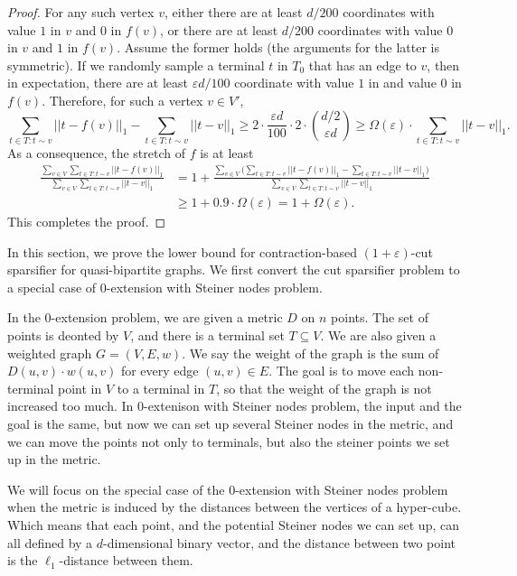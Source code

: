 \documentclass[11pt]{article}
\theoremstyle{definition}
\newcommand{\eps}{{\varepsilon}}
\begin{document}
\begin{proof}
For any such vertex $v$, either there are at least $d/200$ coordinates with value $1$ in $v$ and $0$ in $f(v)$, or there are at least $d/200$ coordinates with value $0$ in $v$ and $1$ in $f(v)$. Assume the former holds (the arguments for the latter is symmetric). 
If we randomly sample a terminal $t$ in $T_0$ that has an edge to $v$, then in expectation, there are at least $\eps d/100$ coordinate with value $1$ in and value $0$ in $f(v)$. Therefore, for such a vertex $v\in V'$, $$\sum_{t\in T: t\sim v}||t-f(v)||_1-\sum_{t\in T: t\sim v}||t-v||_1\ge 2\cdot \frac{\eps d}{100}\cdot 2\cdot \binom{d/2}{\eps d} \ge \Omega(\eps)\cdot \sum_{t\in T: t\sim v}||t-v||_1.$$
As a consequence, the stretch of $f$ is at least
\[
\begin{split}
\frac{\sum_{v\in V}\sum_{t\in T: t\sim v}||t-f(v)||_1}{\sum_{v\in V}\sum_{t\in T: t\sim v}||t-v||_1}
& =1+\frac{\sum_{v\in V}\big(\sum_{t\in T: t\sim v}||t-f(v)||_1-\sum_{t\in T: t\sim v}||t-v||_1\big)}{\sum_{v\in V}\sum_{t\in T: t\sim v}||t-v||_1}\\
& \ge 1+0.9\cdot \Omega(\eps) = 1+\Omega(\eps).
\end{split}
\]
This completes the proof.
\end{proof}







\iffalse

In this section, we prove the lower bound for contraction-based $(1+\eps)$-cut sparsifier for quasi-bipartite graphs. We first convert the cut sparsifier problem to a special case of $0$-extension with Steiner nodes problem.

In the 0-extension problem, we are given a metric $D$ on $n$ points. The set of points is deonted by $V$, and there is a terminal set $T \subseteq V$. We are also given a weighted graph $G=(V,E,w)$. We say the weight of the graph is the sum of $D(u,v)\cdot w(u,v)$ for every edge $(u,v)\in E$. The goal is to move each non-terminal point in $V$ to a terminal in $T$, so that the weight of the graph is not increased too much. In 0-extenison with Steiner nodes problem, the input and the goal is the same, but now we can set up several Steiner nodes in the metric, and we can move the points not only to terminals, but also the steiner points we set up in the metric. 

We will focus on the special case of the 0-extension with Steiner nodes problem when the metric is induced by the distances between the vertices of a hyper-cube. Which means that each point, and the potential Steiner nodes we can set up, can all defined by a $d$-dimensional binary vector, and the distance between two point is the $\ell_1$-distance between them.
\end{document}
